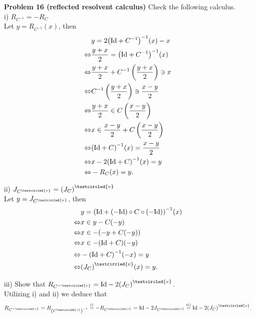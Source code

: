 \documentclass{scrartcl}
\theoremstyle{plain}
\theoremstyle{remark}
\newcommand{\Id}{\textup{Id}}
\newcommand{\ov}{\textcircled{v}}
\begin{document}
\textbf{Problem 16 (reflected resolvent calculus)} Check the following calculus. \\
i) $R_{C^{-1}} = - R_{C}$ \\
Let $y = R_{C^{-1}}(x)$, then
\begin{equation}
  \begin{aligned}
    &y = 2{\left(\Id + C^{-1}\right)}^{-1}(x) - x \\
    \Leftrightarrow& \frac{y+x}{2} = {\left(\Id + C^{-1}\right)}^{-1}(x) \\
    \Leftrightarrow& \frac{y+x}{2} + C^{-1}\left(\frac{y+x}{2}\right) \ni x \\
    \Leftrightarrow& C^{-1}\left(\frac{y+x}{2}\right) \ni \frac{x-y}{2} \\
    \Leftrightarrow& \frac{y+x}{2} \in  C \left( \frac{x-y}{2} \right) \\
    \Leftrightarrow& x \in \frac{x-y}{2} + C \left( \frac{x-y}{2} \right) \\
    \Leftrightarrow& {(\Id + C)}^{-1}(x) = \frac{x-y}{2} \\
    \Leftrightarrow& x-2{(\Id + C)}^{-1}(x) = y \\
    \Leftrightarrow& -R_{C}(x) = y.
  \end{aligned}
\end{equation}

ii) $J_{C^{\ov}} = {(J_{C})}^{\ov}$ \\
Let $y= J_{C^{\ov}}$, then
\begin{equation}
  \begin{aligned}
    &y= {(\Id + (-\Id) \circ C \circ (-\Id))}^{-1}(x) \\
    \Leftrightarrow& x \in y - C(-y) \\
    \Leftrightarrow& x \in - ( -y + C(-y)) \\
    \Leftrightarrow& x \in - {(\Id + C)}(-y) \\
    \Leftrightarrow& -{(\Id + C)}^{-1}(-x) = y \\
    \Leftrightarrow& {(J_{C})}^{\ov}(x) = y.
  \end{aligned}
\end{equation}

iii) Show that $R_{C^{-\ov}} = \Id - 2{(J_{C})}^{\ov}$.\\
Utilizing i) and ii) we deduce that
\begin{equation}
  R_{C^{-\ov}} = R_{\left(C^{\ov}\right)^{-1}} \overset{i)}{=} - R_{C^{\ov}} = \Id - 2 J_{C^{\ov}} \overset{ii)}{=} \Id - 2 {(J_{C})}^{\ov}.
\end{equation}
\end{document}
